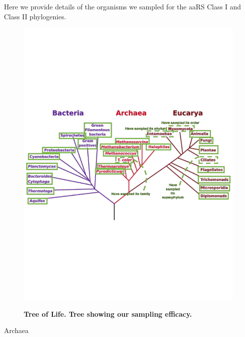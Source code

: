 \documentclass[10pt,letterpaper]{article}
\begin{document}
Here we provide details of the organisms we sampled for the aaRS Class I and Class II phylogenies.

\begin{figure}
  \caption{\bf Tree of Life.  Tree showing our sampling efficacy.}
  \centering
    \includegraphics[width=\textwidth]{TreeofLife.pdf}
  \label{sampledtree}  
\end{figure}

Archaea
\end{document}
